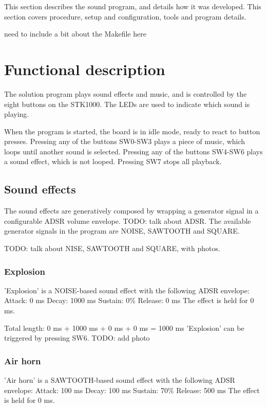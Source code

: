 
This section describes the sound program, and details how it was developed. This section covers procedure, setup and configuration, tools and program details.

need to include a bit about the Makefile here


\section{Functional description}

The solution program plays sound effects and music, and is controlled by the eight buttons on the STK1000.
The LEDs are used to indicate which sound is playing.

When the program is started, the board is in idle mode, ready to react to button presses.
Pressing any of the buttons SW0-SW3 plays a piece of music, which loops until another sound is selected.
Pressing any of the buttons SW4-SW6 plays a sound effect, which is not looped.
Pressing SW7 stops all playback.

\subsection{Sound effects}

The sound effects are generatively composed by wrapping a generator signal in a configurable ADSR volume envelope.
TODO: talk about ADSR.
The available generator signals in the program are NOISE, SAWTOOTH and SQUARE.

TODO: talk about NISE, SAWTOOTH and SQUARE, with photos.

\subsubsection{Explosion}

'Explosion' is a NOISE-based sound effect with the following ADSR envelope:
Attack: 0 ms
Decay:  1000 ms
Sustain: 0\%
Release: 0 ms
The effect is held for 0 ms.

Total length: 0 ms + 1000 ms + 0 ms + 0 ms = 1000 ms
'Explosion' can be triggered by pressing SW6.
TODO: add photo

\subsubsection{Air horn}
'Air horn' is a SAWTOOTH-based sound effect with the following ADSR envelope:
Attack: 100 ms
Decay:  100 ms
Sustain: 70\%
Release: 500 ms
The effect is held for 0 ms.

